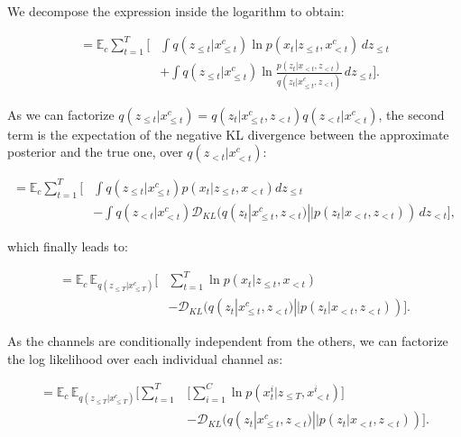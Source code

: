 We decompose the expression inside the logarithm to obtain:

\begin{equation} 
\begin{aligned}
\displaystyle
= \mathbb{E}_c \sum^T_{t=1} \Big[ & \int \mathit{q}(z_{\leq t}|x^c_{\leq t}) \ln \mathit{p}(x_t |z_{\leq t}, x^c_{< t})  \,dz_{\leq t} \\
&+ \int \mathit{q}(z_{\leq t}|x^c_{\leq t}) \ln \frac{\mathit{p}(z_t |x_{< t}, z_{< t})}{\mathit{q}(z_t |x^c_{\leq t}, z_{< t})} \,dz_{\leq t} \Big].
\end{aligned}
\end{equation}

As we can factorize $\mathit{q}(z_{\leq t}|x^c_{\leq t}) = \mathit{q}(z_t |x^c_{\leq t}, z_{< t})\mathit{q}(z_{< t}|x^c_{< t})$, the second term is the expectation of the negative KL divergence between the approximate posterior and the true one, over $\mathit{q}(z_{< t}|x^c_{< t})$:

\begin{equation} 
\begin{aligned}
\displaystyle
= \mathbb{E}_c \sum^T_{t=1} \Big[  & \int \mathit{q}(z_{\leq t}|x^c_{\leq t}) \mathit{p}(x_t |z_{\leq t}, x_{< t}) dz_{\leq t} \\
&- \int \mathit{q}(z_{< t}|x^c_{< t}) \mathcal{D}_{KL}(\mathit{q}(z_t |x^c_{\leq t}, z_{< t}) || \mathit{p}(z_t |x_{< t}, z_{< t})) \,dz_{< t} \Big],
\end{aligned}
\end{equation}

which finally leads to:

\begin{equation} 
\begin{aligned}
\displaystyle
= \mathbb{E}_c \,\mathbb{E}_{\mathit{q}(z_{\leq T}|x^c_{\leq T})}  \Big[ & \sum^T_{t=1} \ln \mathit{p}(x_t |z_{\leq t}, x_{< t}) \\
&- \mathcal{D}_{KL}(\mathit{q}(z_t |x^c_{\leq t}, z_{< t}) || \mathit{p}(z_t |x_{< t}, z_{< t})) \Big].
\end{aligned}
\end{equation}

As the channels are conditionally independent from the others, we can factorize the log likelihood over each individual channel as:

\begin{equation} 
\begin{aligned} \label{rnn:eq:finalopt}
\displaystyle
= \mathbb{E}_c \,\mathbb{E}_{\mathit{q}(z_{\leq T}|x^c_{\leq T})} \Big[ \sum^T_{t=1} & \Big[ \sum^C_{i=1} \ln \mathit{p}(x^i_t |z_{\leq T}, x^i_{< t}) \Big] \\
&- \mathcal{D}_{KL}( \mathit{q}(z_t |x^c_{\leq t}, z_{< t}) || \mathit{p}(z_t |x_{< t}, z_{< t})) \Big].
\end{aligned}
\end{equation}

